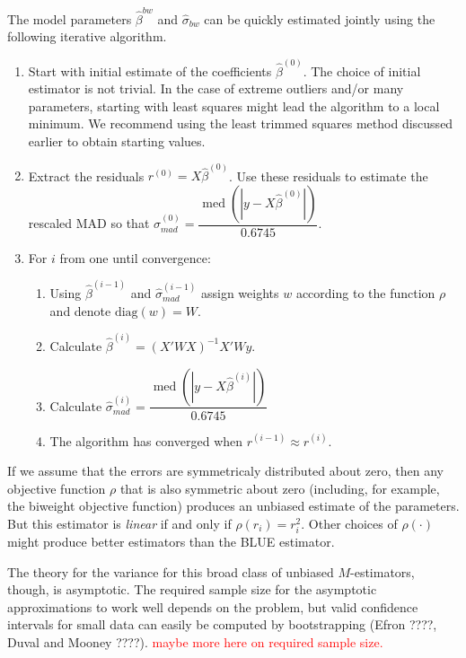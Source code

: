 \documentclass[12pt]{article}
\DeclareMathOperator{\med}{med}
\newcommand{\ctk}[1]{\textcolor{red}{#1}}
\begin{document}
The model parameters $\hat{\beta}^{bw}$ and $\hat{\sigma}_{bw}$ can be quickly estimated jointly using the following iterative algorithm.
\begin{enumerate}
\item Start with initial estimate of the coefficients $\hat{\beta}^{(0)}$. The choice of initial estimator is not trivial. 
In the case of extreme outliers and/or many parameters, starting with least squares might lead the algorithm to a local minimum. 
We recommend using the least trimmed squares method discussed earlier to obtain starting values.
\item Extract the residuals $r^{(0)} = X\hat{\beta}^{(0)}$. 
Use these residuals to estimate the rescaled MAD so that $\hat{\sigma}^{(0)}_{mad} = \dfrac{\med\left( |y - X\hat{\beta}^{(0)}|\right)}{0.6745}$.
\item For $i$ from one until convergence:
        \begin{enumerate}
        \item Using $\hat{\beta}^{(i-1)}$ and $\hat{\sigma}^{(i-1)}_{mad}$ assign weights $w$ according to the function $\rho$ and denote $\text{diag}(w) = W$.
        \item Calculate $\hat{\beta}^{(i)} = (X'WX)^{-1}X'Wy$.
        \item Calculate $\hat{\sigma}^{(i)}_{mad} = \dfrac{\med\left( |y - X\hat{\beta}^{(i)}|\right)}{0.6745}$
        \item The algorithm has converged when $r^{(i-1)} \approx r^{(i)}$.
        \end{enumerate}
\end{enumerate}

If we assume that the errors are symmetricaly distributed about zero, then any objective function $\rho$ that is also symmetric about zero (including, for example, the biweight objective function) produces an unbiased estimate of the parameters. 
But this estimator is \textit{linear} if and only if $\rho(r_i) = r_i^2$. Other choices of $\rho(\cdot)$ might produce better estimators than the BLUE estimator.  

The theory for the variance for this broad class of unbiased $M$-estimators, though, is asymptotic. 
The required sample size for the asymptotic approximations to work well depends on the problem, but valid confidence intervals for small data can easily be computed by bootstrapping (Efron ????, Duval and Mooney ????). 
\ctk{maybe more here on required sample size.}
\end{document}
